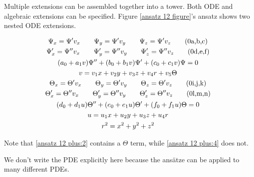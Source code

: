\documentclass{article}
\theoremstyle{definition}
\theoremstyle{plain}
\begin{document}
Multiple extensions can be assembled together into a tower.  Both ODE and algebraic extensions can be specified.
Figure \ref{ansatz 12 figure}'s ansatz shows two nested ODE extensions.

\begin{subequations}
\label{ansatz 12 plus}
\begin{gather}
\Psi_x = \Psi' v_x \qquad
\Psi_y = \Psi' v_y \qquad
\Psi_z = \Psi' v_z \stepcounter{equation}\stepcounter{equation}\stepcounter{equation}\tag{\arabic{parentequation}a,b,c} \\
\Psi'_x = \Psi'' v_x \qquad
\Psi'_y = \Psi'' v_y \qquad
\Psi'_z = \Psi'' v_z \stepcounter{equation}\stepcounter{equation}\stepcounter{equation}\tag{\arabic{parentequation}d,e,f} \\
(a_0 + a_1 v) \Psi'' + (b_0 + b_1 v) \Psi' + (c_0 + c_1 v) \Psi = 0 \label{ansatz 12 plus:1} \\
v = v_1 x + v_2 y + v_3 z + v_4 r + v_5 \Theta \label{ansatz 12 plus:2} \\
\Theta_x = \Theta' v_x \qquad
\Theta_y = \Theta' v_y \qquad
\Theta_z = \Theta' v_z \stepcounter{equation}\stepcounter{equation}\stepcounter{equation}\tag{\arabic{parentequation}i,j,k} \\
\Theta'_x = \Theta'' v_x \qquad
\Theta'_y = \Theta'' v_y \qquad
\Theta'_z = \Theta'' v_z \stepcounter{equation}\stepcounter{equation}\stepcounter{equation}\tag{\arabic{parentequation}l,m,n} \\
(d_0 + d_1 u) \Theta'' + (e_0 + e_1 u) \Theta' + (f_0 + f_1 u) \Theta = 0 \label{ansatz 12 plus:3} \\
u = u_1 x + u_2 y + u_3 z + u_4 r \label{ansatz 12 plus:4} \\
r^2 = x^2 + y^2 + z^2
\end{gather}
\end{subequations}

Note that \eqref{ansatz 12 plus:2} contains a $\Theta$ term, while \eqref{ansatz 12 plus:4} does not.

We don't write the PDE explicitly here because the ans\"atze can be applied to many different PDEs.

\vfill\eject
\end{document}
